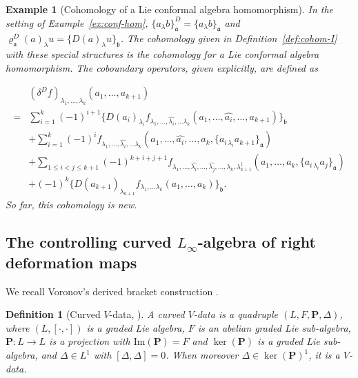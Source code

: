 \documentclass[a4paper,11pt]{article}
\def\Vs{\mathfrak{a}}
\def\Ws{\mathfrak{b}}
\def\rep{\varrho}
\def\la{\lambda}
\numberwithin{equation}{section}
\newtheorem{definition}[theorem]{Definition}
\newtheorem{example}[theorem]{Example}
\begin{document}
\begin{example}[Cohomology of a Lie conformal  algebra homomorphism]\label{ex:coh conf-hom}
In the setting of Example~\ref{ex:conf-hom}, $\{a_\la b\}^D_\Vs
= \{a_\la b\}_\Vs$ and $\rep^D_\Vs(a)_\la u = \{D(a)_\la u\}_\Ws$.
The cohomology given in Definition~\ref{def:cohom-I} with these special structures  is the
\textit{cohomology for a Lie conformal  algebra homomorphism}.  The coboundary operators, given explicitly, are defined as 

\begin{equation}\label{Coh: homomorphism}
\begin{split}
  &(\delta^D f)_{\la_1,\ldots,\la_k}
  (a_1,\ldots,a_{k+1}) \\
  =& \sum_{i=1}^{k}(-1)^{i+1}
     \{D(a_i)_{\la_i}
     f_{\la_1,\ldots,\widehat{\la_i},\ldots \la_k}(a_1,\ldots,\widehat{a_i},\ldots,a_{k+1})\}_\Ws
     \\
  &
    + \sum_{i=1}^{k}(-1)^i
    f_{\la_1,\ldots,\widehat{\la_i},\ldots \la_k}
      (a_1,\ldots,\widehat{a_i},\ldots,a_k,
       \{a_{i\,\la_i} a_{k+1}\}_\Vs) 
      \\
  &
    + \!\!\sum_{1\leq i<j\leq k+1}\!\!(-1)^{k+i+j+1}
      f_{\la_1,\ldots,\widehat{\la_i},\ldots ,\widehat{\la_j},\ldots, \la_k,\la_{k+1}^\ddag}
      (a_1,\ldots,a_k,\{a_{i\,\la_i}a_j\}_\Vs)
      \\
      &
     +(-1)^{k}
     \{D(a_{k+1})_{\la_{k+1}}
     f_{\la_1,\ldots \la_k}(a_1,\ldots,a_{k})\}_\Ws
     .
\end{split}
\end{equation}
So far, this cohomology is new.
\end{example}
 

 
\subsection{The controlling curved $L_\infty$-algebra of right deformation maps}
\label{subsec:control-I}
 
We recall Voronov's derived bracket construction \cite{Vo}.
 
\begin{definition}[Curved $V$-data, {\cite{Vo}}]\label{def:cVdata-I}
A \textit{curved $V$-data} is a quadruple $(L,F,\mathbf{P},\Delta)$,
where $(L,[\cdot,\cdot])$ is a graded Lie algebra, $F$ is an abelian
graded Lie sub-algebra, $\mathbf{P}:L\to L$ is a projection with
$\mathrm{Im}(\mathbf{P})=F$ and $\ker(\mathbf{P})$ is a graded Lie
sub-algebra, and $\Delta\in L^1$ with $[\Delta,\Delta]=0$.  When
moreover $\Delta\in\ker(\mathbf{P})^1$, it is a \textit{$V$-data}.
\end{definition}
 
\end{document}
